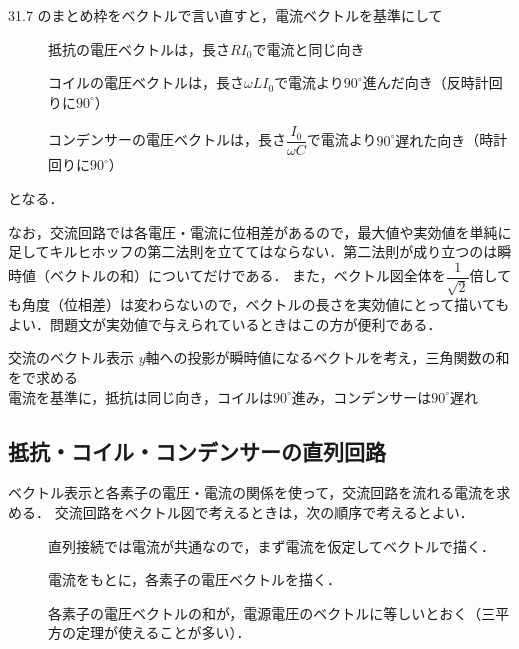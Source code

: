 31.7 のまとめ枠をベクトルで言い直すと，電流ベクトルを基準にして
\begin{description}
\item[] 抵抗の電圧ベクトルは，長さ$RI_0$で電流と{\gtfamily 同じ向き}
\item[] コイルの電圧ベクトルは，長さ$\omega LI_0$で電流より{\gtfamily $90^\circ$進んだ向き}（反時計回りに$90^\circ$）
\item[] コンデンサーの電圧ベクトルは，長さ$\dfrac{I_0}{\omega C}$で電流より{\gtfamily $90^\circ$遅れた向き}（時計回りに$90^\circ$）
\end{description}
となる．

なお，交流回路では各電圧・電流に位相差があるので，{\gtfamily 最大値や実効値を単純に足してキルヒホッフの第二法則を立ててはならない}．第二法則が成り立つのは瞬時値（ベクトルの和）についてだけである．
また，ベクトル図全体を$\dfrac{1}{\sqrt{2}}$倍しても角度（位相差）は変わらないので，{\gtfamily ベクトルの長さを実効値にとって描いてもよい}．問題文が実効値で与えられているときはこの方が便利である．

\bsNeed{30mm}
\begin{matome}{交流のベクトル表示}
 \hspace{3mm} $y$軸への投影が瞬時値になるベクトルを考え，三角関数の和をで求める\\
 \hspace{3mm} 電流を基準に，抵抗は同じ向き，コイルは$90^\circ$進み，コンデンサーは$90^\circ$遅れ
\end{matome}

\subsection{抵抗・コイル・コンデンサーの直列回路}

ベクトル表示と各素子の電圧・電流の関係を使って，交流回路を流れる電流を求める．
交流回路をベクトル図で考えるときは，次の順序で考えるとよい．
\begin{description}
\item[] 直列接続では{\gtfamily 電流が共通}なので，まず電流を仮定してベクトルで描く．
\item[] 電流をもとに，各素子の電圧ベクトルを描く．
\item[] 各素子の電圧ベクトルの和が，電源電圧のベクトルに等しいとおく（三平方の定理が使えることが多い）．
\end{description}

